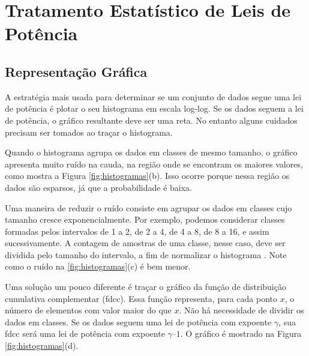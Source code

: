 \documentclass{article}
\begin{document}
\section{Tratamento Estatístico de Leis de Potência} \label{sec:estatistica}

\subsection{Representação Gráfica}

A estratégia mais usada para determinar se um conjunto de dados segue uma lei de potência é plotar o seu histograma em escala log-log. Se os dados seguem a lei de potência, o gráfico resultante deve ser uma reta. No entanto alguns cuidados precisam ser tomados ao traçar o histograma.

Quando o histograma agrupa os dados em classes de mesmo tamanho, o gráfico apresenta muito ruído na cauda, na região onde se encontram os maiores valores, como mostra a Figura \ref{fig:histogramas}(b). Isso ocorre porque nessa região os dados são esparsos, já que a probabilidade é baixa.

Uma maneira de reduzir o ruído consiste em agrupar os dados em classes cujo tamanho cresce exponencialmente. Por exemplo, podemos considerar classes formadas pelos intervalos de 1 a 2, de 2 a 4, de 4 a 8, de 8 a 16, e assim sucessivamente. A contagem de amostras de uma classe, nesse caso, deve ser dividida pelo tamanho do intervalo, a fim de normalizar o histograma \cite{Newman2005}. Note como o ruído na \ref{fig:histogramas}(c) é bem menor.

Uma solução um pouco diferente é traçar o gráfico da função de distribuição cumulativa complementar (fdcc). Essa função representa, para cada ponto $x$, o número de elementos com valor maior do que $x$. Não há necessidade de dividir os dados em classes. Se os dados seguem uma lei de potência com expoente $\gamma$, sua fdcc será uma lei de potência com expoente $\gamma – 1$. O gráfico é mostrado na Figura \ref{fig:histogramas}(d).
\end{document}
